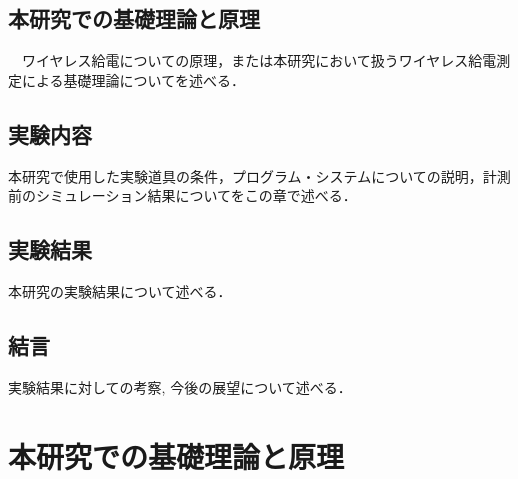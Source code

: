 \documentclass[12pt]{jarticle}
\begin{document}
\subsection*{本研究での基礎理論と原理}　ワイヤレス給電についての原理，または本研究において扱うワイヤレス給電測定による基礎理論についてを述べる．
\subsection*{実験内容}
	本研究で使用した実験道具の条件，プログラム・システムについての説明，計測前のシミュレーション結果についてをこの章で述べる．
\subsection*{実験結果}
	本研究の実験結果について述べる．
\subsection*{結言}
	実験結果に対しての考察, 今後の展望について述べる．
\clearpage
\section{本研究での基礎理論と原理}
\end{document}
